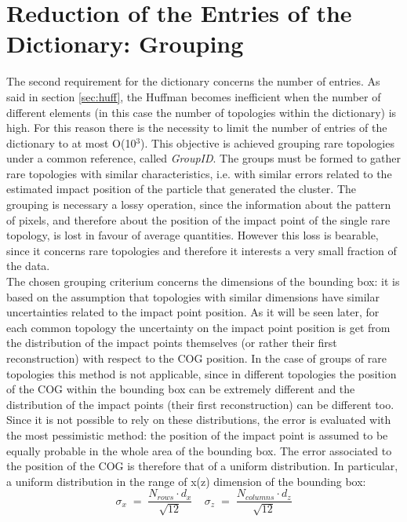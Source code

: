 \section{Reduction of the Entries of the Dictionary: Grouping}
The second requirement for the dictionary concerns the number of entries. As said in section \ref{sec:huff}, the Huffman becomes inefficient when the number of different elements (in this case the number of topologies within the dictionary) is high. For this reason there is the necessity to limit the number of entries of the dictionary to at most O(10$^3$). This objective is achieved grouping rare topologies under a common reference, called \textit{GroupID}. The groups must be formed to gather rare topologies with similar characteristics, i.e. with similar errors related to the estimated impact position of the particle that generated the cluster. The grouping is necessary a lossy operation, since the information about the pattern of pixels, and therefore about the position of the impact point of the single rare topology, is lost in favour of average quantities. However this loss is bearable, since it concerns rare topologies and therefore it interests a very small fraction of the data.\\
The chosen grouping criterium concerns the dimensions of the bounding box: it is based on the assumption that topologies with similar dimensions have similar uncertainties related to the impact point position. As it will be seen later, for each common topology the uncertainty on the impact point position is get from the distribution of the impact points themselves (or rather their first reconstruction) with respect to the COG position. In the case of groups of rare topologies this method is not applicable, since in different topologies the position of the COG within the bounding box can be extremely different and the distribution of the impact points (their first reconstruction) can be different too. Since it is not possible to rely on these distributions, the error is evaluated with the most pessimistic method: the position of the impact point is assumed to be equally probable in the whole area of the bounding box. The error associated to the position of the COG is therefore that of a uniform distribution. In particular, a uniform distribution in the range of x(z) dimension of the bounding box:
\begin{equation}
 \sigma_x \; = \; \frac{N_{rows} \cdot d_x}{\sqrt{12}} \ \ \ \ \  \sigma_z \; = \; \frac{N_{columns} \cdot d_z}{\sqrt{12}}
\end{equation}
